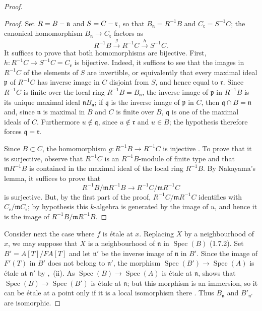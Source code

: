 \begin{proof}
\begin{proof}
Set $R=B-\mathfrak{n}$ and $S=C-\mathfrak{r}$, so that $B_\mathfrak{n}=R^{-1}B$ and $C_\mathfrak{r}=S^{-1}C$; the canonical homomorphism $B_\mathfrak{n}\to C_\mathfrak{r}$ factors as
\[
R^{-1}B\xrightarrow{g}R^{-1}C\xrightarrow{h}S^{-1}C.
\]
It suffices to prove that both homomorphisms are bijective.
First, $h:R^{-1}C\to S^{-1}C=C_\mathfrak{r}$ is bijective.
Indeed, it suffices to see that the images in $R^{-1}C$ of the elements of $S$ are invertible, or equivalently that every maximal ideal $\mathfrak{p}$ of $R^{-1}C$ has inverse image in $C$ disjoint from $S$, and hence equal to $\mathfrak{r}$.
Since $R^{-1}C$ is finite over the local ring $R^{-1}B=B_\mathfrak{n}$, the inverse image of $\mathfrak{p}$ in $R^{-1}B$ is its unique maximal ideal $\mathfrak{n}B_\mathfrak{n}$; if $\mathfrak{q}$ is the inverse image of $\mathfrak{p}$ in $C$, then $\mathfrak{q}\cap B=\mathfrak{n}$ and, since $\mathfrak{n}$ is maximal in $B$ and $C$ is finite over $B$, $\mathfrak{q}$ is one of the maximal ideals of $C$.
Furthermore $u\notin\mathfrak{q}$, since $u\notin\mathfrak{r}$ and $u\in B$; the hypothesis therefore forces $\mathfrak{q}=\mathfrak{r}$.

Since $B\subset C$, the homomorphism $g:R^{-1}B\to R^{-1}C$ is injective .
To prove that it is surjective, observe that $R^{-1}C$ is an $R^{-1}B$-module of finite type and that $\mathfrak{m}R^{-1}B$ is contained in the maximal ideal of the local ring $R^{-1}B$.
By Nakayama's lemma, it suffices to prove that
\[
R^{-1}B/\mathfrak{m}R^{-1}B\longrightarrow R^{-1}C/\mathfrak{m}R^{-1}C
\]
is surjective.
But, by the first part of the proof, $R^{-1}C/\mathfrak{m}R^{-1}C$ identifies with $C_\mathfrak{r}/\mathfrak{m}C_\mathfrak{r}$; by hypothesis this $k$-algebra is generated by the image of $u$, and hence it is the image of $R^{-1}B/\mathfrak{m}R^{-1}B$.
\end{proof}

Consider next the case where $f$ is \'etale at $x$.
Replacing $X$ by a neighbourhood of $x$, we may suppose that $X$ is a neighbourhood of $\mathfrak{n}$ in $\operatorname{Spec}(B)$ (1.7.2).
Set $B'=A[T]/F A[T]$ and let $\mathfrak{n}'$ be the inverse image of $\mathfrak{n}$ in $B'$.
Since the image of $F'(T)$ in $B'$ does not belong to $\mathfrak{n}'$, the morphism $\operatorname{Spec}(B')\to\operatorname{Spec}(A)$ is \'etale at $\mathfrak{n}'$ by ,~(ii).
As $\operatorname{Spec}(B)\to\operatorname{Spec}(A)$ is \'etale at $\mathfrak{n}$,  shows that $\operatorname{Spec}(B)\to\operatorname{Spec}(B')$ is \'etale at $\mathfrak{n}$; but this morphism is an immersion, so it can be \'etale at a point only if it is a local isomorphism there .
Thus $B_\mathfrak{n}$ and $B'_{\mathfrak{n}'}$ are isomorphic.


\end{proof}
